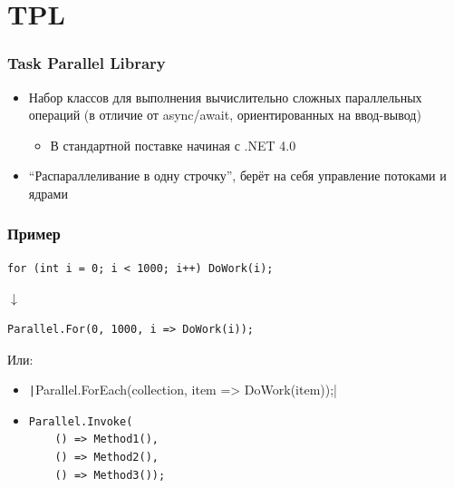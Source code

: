 \documentclass[xetex,mathserif,serif]{beamer}
\newcommand{\DownArrow} {
    \hspace{2cm}\begin{LARGE}$\downarrow$\end{LARGE}
}
\begin{document}
    \section{TPL}

    \begin{frame}
        \frametitle{Task Parallel Library}
        \begin{itemize}
            \item Набор классов для выполнения вычислительно сложных параллельных операций (в отличие от async/await, ориентированных на ввод-вывод)
            \begin{itemize}
                \item В стандартной поставке начиная с .NET 4.0
            \end{itemize}
            \item ``Распараллеливание в одну строчку'', берёт на себя управление потоками и ядрами
        \end{itemize}
    \end{frame}

    \begin{frame}[fragile]
        \frametitle{Пример}
        \begin{verbatim}
for (int i = 0; i < 1000; i++) DoWork(i);
        \end{verbatim}
        \DownArrow
        \begin{verbatim}
Parallel.For(0, 1000, i => DoWork(i));
        \end{verbatim}

        Или:
        \begin{itemize}
            \item \texttt|Parallel.ForEach(collection, item => DoWork(item));|
            \item 
                \begin{verbatim}
Parallel.Invoke(
    () => Method1(),
    () => Method2(),
    () => Method3());
                \end{verbatim}
        \end{itemize}
    \end{frame}
\end{document}
